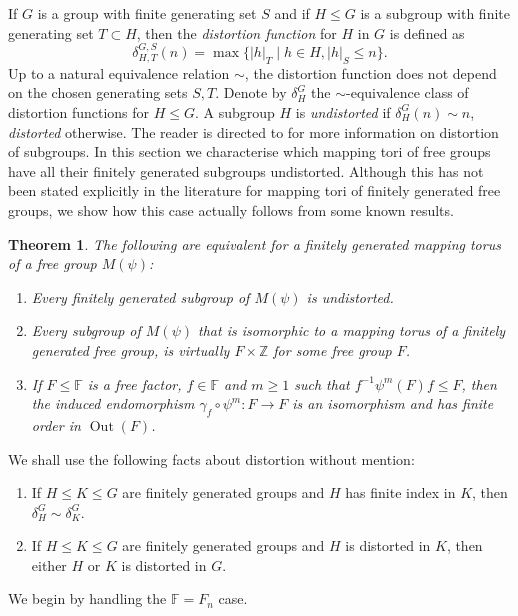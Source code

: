 \documentclass[11pt, a4paper]{amsart}
\newtheorem{theorem}{Theorem}[section]
\theoremstyle{definition}
\newcommand{\F}{\mathbb{F}}
\newcommand{\Z}{\mathbb{Z}}
\DeclareMathOperator{\Out}{Out}
\begin{document}
If $G$ is a group with finite generating set $S$ and if $H\leqslant G$ is a subgroup with finite generating set $T\subset H$, then the \emph{distortion function} for $H$ in $G$ is defined as
\[
\delta_{H, T}^{G, S}(n) = \max\{ |h|_T \mid h\in H, |h|_S\leqslant n\}.  
\]
Up to a natural equivalence relation $\sim$, the distortion function does not depend on the chosen generating sets $S, T$. Denote by $\delta_{H}^G$ the $\sim$-equivalence class of distortion functions for $H\leqslant G$. A subgroup $H$ is \emph{undistorted} if $\delta_H^G(n)\sim n$, \emph{distorted} otherwise. The reader is directed to \cite{Fa94} for more information on distortion of subgroups. In this section we characterise which mapping tori of free groups have all their finitely generated subgroups undistorted. Although this has not been stated explicitly in the literature for mapping tori of finitely generated free groups, we show how this case actually follows from some known results.



\begin{theorem}
\label{thm:locally_undistorted}
The following are equivalent for a finitely generated mapping torus of a free group $M(\psi)$:
\begin{enumerate}
\item Every finitely generated subgroup of $M(\psi)$ is undistorted.
\item Every subgroup of $M(\psi)$ that is isomorphic to a mapping torus of a finitely generated free group, is virtually $F\times \Z$ for some free group $F$.
\item If $F\leqslant \F$ is a free factor, $f\in \F$ and $m\geqslant 1$ such that $f^{-1}\psi^m(F)f\leqslant F$, then the induced endomorphism $\gamma_f\circ\psi^m\colon F\to F$ is an isomorphism and has finite order in $\Out(F)$.
\end{enumerate}
\end{theorem}


We shall use the following facts about distortion without mention:
\begin{enumerate}
\item If $H\leqslant K\leqslant G$ are finitely generated groups and $H$ has finite index in $K$, then $\delta_H^G\sim\delta_K^G$.
\item If $H\leqslant K\leqslant G$ are finitely generated groups and $H$ is distorted in $K$, then either $H$ or $K$ is distorted in $G$.
\end{enumerate}

We begin by handling the $\F = F_n$ case.
\end{document}
